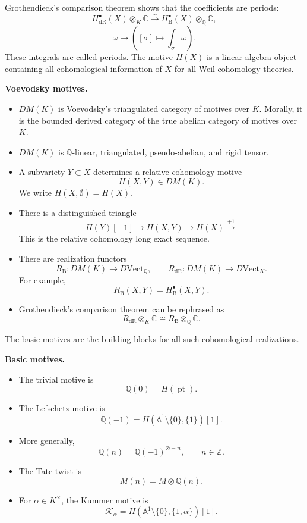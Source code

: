 Grothendieck's comparison theorem
shows that the coefficients are
periods:
\[
        H^\bullet_{\mathrm{dR}}(X)
        \otimes_K \mathbb C
        \xrightarrow{\sim}
        H^\bullet_{\mathrm{B}}(X)
        \otimes_{\mathbb Q} \mathbb C,
\]
\[
        \omega \mapsto
        \left(
        [\sigma] \mapsto
        \int_\sigma \omega
        \right).
\]
These integrals are called periods.
The motive $H(X)$ is a linear algebra
object containing all cohomological
information of $X$ for all Weil
cohomology theories.

\medskip\noindent
{\bf Voevodsky motives.}

\begin{itemize}
\item $DM(K)$ is Voevodsky's
triangulated category of motives over
$K$.
Morally, it is the bounded derived
category of the true abelian category
of motives over $K$.
\item $DM(K)$ is $\mathbb Q$-linear,
triangulated, pseudo-abelian, and
rigid tensor.
\item A subvariety $Y\subset X$
determines a relative cohomology motive
\[
        H(X,Y)\in DM(K).
\]
We write $H(X,\emptyset)=H(X)$.
\item There is a distinguished triangle
\[
        H(Y)[-1]
        \to
        H(X,Y)
        \to
        H(X)
        \xrightarrow{+1}
\]
This is the relative cohomology long
exact sequence.
\item There are realization functors
\[
        R_{\mathrm{B}}:DM(K)\to
        D\mathrm{Vect}_{\mathbb Q},
        \qquad
        R_{\mathrm{dR}}:DM(K)\to
        D\mathrm{Vect}_K.
\]
For example,
\[
        R_{\mathrm{B}}(X,Y)
        =
        H^\bullet_{\mathrm{B}}(X,Y).
\]
\item Grothendieck's comparison
theorem can be rephrased as
\[
        R_{\mathrm{dR}}
        \otimes_K \mathbb C
        \cong
        R_{\mathrm{B}}
        \otimes_{\mathbb Q} \mathbb C.
\]
\end{itemize}

The basic motives are the building
blocks for all such cohomological
realizations.

\medskip\noindent
{\bf Basic motives.}

\begin{itemize}
\item The trivial motive is
\[
        \mathbb Q(0)=H(\operatorname{pt}).
\]
\item The Lefschetz motive is
\[
        \mathbb Q(-1)
        =
        H(\mathbb A^1\setminus\{0\},
        \{1\})[1].
\]
\item More generally,
\[
        \mathbb Q(n)
        =
        \mathbb Q(-1)^{\otimes -n},
        \qquad n\in\mathbb Z.
\]
\item The Tate twist is
\[
        M(n)=M\otimes \mathbb Q(n).
\]
\item For $\alpha\in K^\times$, the
Kummer motive is
\[
        \mathcal K_\alpha
        =
        H(\mathbb A^1\setminus\{0\},
        \{1,\alpha\})[1].
\]
\end{itemize}

